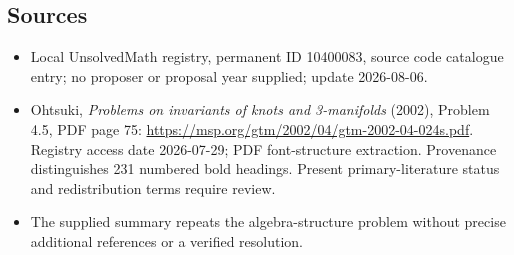\documentclass[11pt]{article}
\begin{document}
\subsection{Sources}
\begin{itemize}
\item Local UnsolvedMath registry, permanent ID 10400083, source code catalogue entry; no proposer or proposal year supplied; update 2026-08-06.
\item Ohtsuki, \emph{Problems on invariants of knots and 3-manifolds} (2002), Problem 4.5, PDF page 75: \url{https://msp.org/gtm/2002/04/gtm-2002-04-024s.pdf}. Registry access date 2026-07-29; PDF font-structure extraction. Provenance distinguishes 231 numbered bold headings. Present primary-literature status and redistribution terms require review.
\item The supplied summary repeats the algebra-structure problem without precise additional references or a verified resolution.
\end{itemize}
\end{document}
